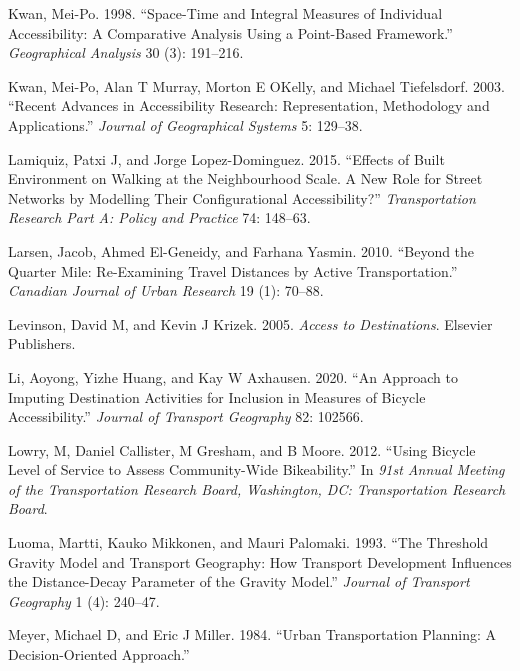 \documentclass[preprint, 3p,
authoryear]{elsarticle} %
\newlength{\cslhangindent}
\newlength{\cslentryspacingunit} %
\newenvironment{CSLReferences}[2] %
 {%
  \setlength{\parindent}{0pt}
  \ifodd #1
  \let\oldpar\par
  \def\par{\hangindent=\cslhangindent\oldpar}
  \fi
  \setlength{\parskip}{#2\cslentryspacingunit}
 }%
 {}
\begin{document}
\begin{CSLReferences}{1}{0}
\leavevmode{}%
Kwan, Mei-Po. 1998. {``Space-Time and Integral Measures of Individual
Accessibility: A Comparative Analysis Using a Point-Based Framework.''}
\emph{Geographical Analysis} 30 (3): 191--216.

\leavevmode{}%
Kwan, Mei-Po, Alan T Murray, Morton E OKelly, and Michael Tiefelsdorf.
2003. {``Recent Advances in Accessibility Research: Representation,
Methodology and Applications.''} \emph{Journal of Geographical Systems}
5: 129--38.

\leavevmode{}%
Lamiquiz, Patxi J, and Jorge Lopez-Dominguez. 2015. {``Effects of Built
Environment on Walking at the Neighbourhood Scale. A New Role for Street
Networks by Modelling Their Configurational Accessibility?''}
\emph{Transportation Research Part A: Policy and Practice} 74: 148--63.

\leavevmode{}%
Larsen, Jacob, Ahmed El-Geneidy, and Farhana Yasmin. 2010. {``Beyond the
Quarter Mile: Re-Examining Travel Distances by Active Transportation.''}
\emph{Canadian Journal of Urban Research} 19 (1): 70--88.

\leavevmode{}%
Levinson, David M, and Kevin J Krizek. 2005. \emph{Access to
Destinations}. Elsevier Publishers.

\leavevmode{}%
Li, Aoyong, Yizhe Huang, and Kay W Axhausen. 2020. {``An Approach to
Imputing Destination Activities for Inclusion in Measures of Bicycle
Accessibility.''} \emph{Journal of Transport Geography} 82: 102566.

\leavevmode{}%
Lowry, M, Daniel Callister, M Gresham, and B Moore. 2012. {``Using
Bicycle Level of Service to Assess Community-Wide Bikeability.''} In
\emph{91st Annual Meeting of the Transportation Research Board,
Washington, DC: Transportation Research Board}.

\leavevmode{}%
Luoma, Martti, Kauko Mikkonen, and Mauri Palomaki. 1993. {``The
Threshold Gravity Model and Transport Geography: How Transport
Development Influences the Distance-Decay Parameter of the Gravity
Model.''} \emph{Journal of Transport Geography} 1 (4): 240--47.

\leavevmode{}%
Meyer, Michael D, and Eric J Miller. 1984. {``Urban Transportation
Planning: A Decision-Oriented Approach.''}


\end{CSLReferences}
\end{document}
